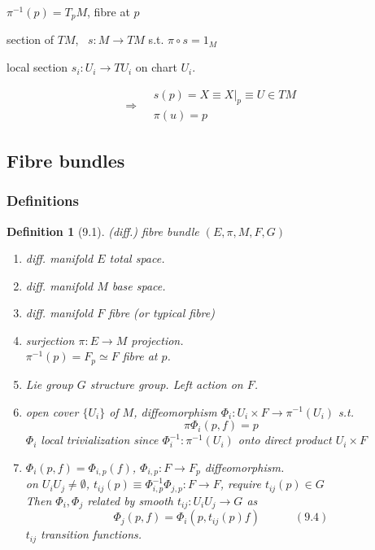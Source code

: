 \documentclass[twoside]{amsart}
\newtheorem{definition}{Definition}
\begin{document}
$\pi^{-1}(p) = T_p M$, fibre at $p$

section of $TM$, \, $s: M \to TM$ s.t. $\pi \circ s = 1_M$

local section $s_i : U_i \to TU_i$ on chart $U_i$.  

\[
\Longrightarrow \begin{aligned} &  s(p) = X \equiv \left. X \right|_p \equiv U \in TM \\
 & \pi(u) = p \end{aligned}
\]





\subsection{ Fibre bundles }


\subsubsection{ Definitions}


\begin{definition}[9.1] (diff.) fibre bundle $(E, \pi , M, F , G)$ 
\begin{enumerate}
\item[(i)] diff. manifold $E$ total space.  
\item[(ii)] diff. manifold $M$ base space. 
\item[(iii)] diff. manifold $F$ fibre (or typical fibre)
\item[(iv)] surjection $\pi : E \to M$ projection.  \\
\phantom{surjection} $\pi^{-1}(p) = F_p \simeq F$ fibre at $p$.  
\item[(v)] Lie group $G$ structure group.  Left action on $F$.   
\item[(vi)] open cover $\lbrace U_i \rbrace $ of $M$, diffeomorphism $\Phi_i : U_i \times F \to \pi^{-1}(U_i)$ s.t. 
\[
\pi \Phi_i(p, f) = p 
\]
$\Phi_i$ local trivialization since $\Phi_i^{-1} : \pi^{-1}(U_i)$ onto direct product $U_i \times F$
\item[(vii)]  $\Phi_i(p,f) = \Phi_{i,p}(f)$, $\Phi_{i,p} : F \to F_p$ diffeomorphism.  \\
on $U_i U_j \neq \emptyset$, $t_{ij}(p) \equiv \Phi_{i,p}^{-1} \Phi_{j, p } : F \to F$, require $t_{ij}(p) \in G$ \\
Then $\Phi_i, \Phi_j$ related by smooth $t_{ij} : U_i U_j \to G$ as 
\[
\Phi_j(p,f ) = \Phi_i(p,t_{ij}(p) f ) \quad \quad \quad (9.4)
\]
$t_{ij}$ transition functions.  
\end{enumerate}
\end{definition}
\end{document}
